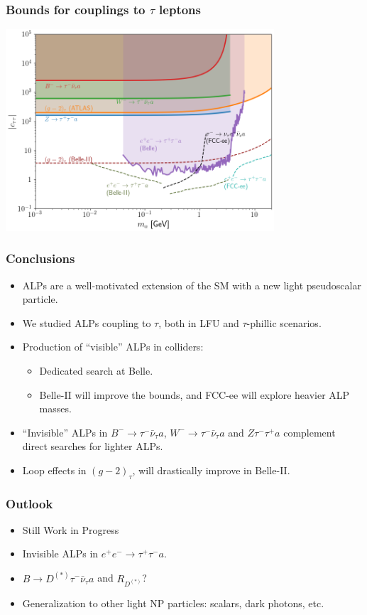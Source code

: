 \documentclass[mathserif, 10pt, aspectratio=169]{beamer}
\begin{document}
\begin{frame}\frametitle{Bounds for couplings to $\tau$ leptons}
    \begin{center}
        \includegraphics[width=0.75\textwidth]{figures/moneyplot.png}
    \end{center}
\end{frame}


\begin{frame}\frametitle{Conclusions}
    \begin{itemize}\setlength{\itemsep}{15pt}
        \item ALPs are a well-motivated extension of the SM with a new light pseudoscalar particle.
        \item We studied ALPs coupling to $\tau$, both in LFU and $\tau$-phillic scenarios.
        \item Production of ``visible'' ALPs in colliders:
        \begin{itemize}
            \item Dedicated search at Belle.
            \item Belle-II will improve the bounds, and FCC-ee will explore heavier ALP masses.
        \end{itemize}
        \item ``Invisible'' ALPs in $B^-\to \tau^-\bar{\nu}_\tau a$, $W^-\to \tau^-\bar{\nu}_\tau a$ and $Z \tau^-\tau^+ a$ complement direct searches for lighter ALPs.
        \item Loop effects in $(g-2)_\tau$, will drastically improve in Belle-II.
    \end{itemize}
\end{frame}

\begin{frame}\frametitle{Outlook}
    \begin{itemize}\setlength{\itemsep}{15pt}
        \item Still Work in Progress
        \item Invisible ALPs in $e^+e^-\to \tau^+\tau^- a$.
        \item $B\to D^{(*)}\tau^-\bar{\nu}_\tau a$ and $R_{D^{(*)}}$?
        \item Generalization to other light NP particles: scalars, dark photons, etc.
    \end{itemize}
\end{frame}
\end{document}
